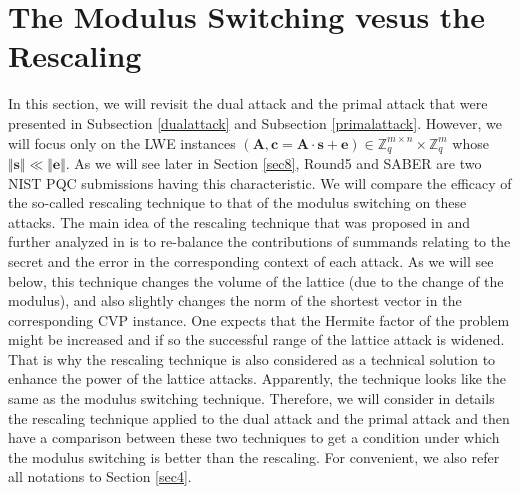 \documentclass{cta-author}
\begin{document}
\section{The Modulus Switching vesus the Rescaling } \label{modvsre}
In this section, we will revisit the dual attack and the primal attack that were presented in Subsection \ref{dualattack} and Subsection \ref{primalattack}. However, we will focus only on the LWE instances  $(\mathbf{A}, \mathbf{c}=\mathbf{A}\cdot \mathbf{s}+\mathbf{e}) \in \mathbb{Z}_q^{m \times n} \times \mathbb{Z}_q^m$ whose $\Vert \mathbf{s}\Vert \ll \Vert \mathbf{e} \Vert$. As we will see later in Section \ref{sec8}, Round5 \cite{BBGM+19} and SABER \cite{DKRV19} are two NIST PQC submissions having this characteristic. 
We will compare the efficacy of the so-called rescaling technique to that of the modulus switching on these attacks. The main idea of the rescaling technique that was proposed in \cite[Subsection 6.1]{BG14} and further analyzed in \cite{CKLS16, BBGM+19} is to re-balance the contributions of summands relating to the secret and the error in the corresponding context of each attack. As we will see below, this technique changes the volume of the lattice (due to the change of the modulus), and also slightly changes the norm of the shortest vector in the corresponding CVP instance. One expects that the Hermite factor of the problem might be increased and if so the successful range of the lattice attack is widened. That is why the rescaling technique is also considered as a technical solution to enhance the power of the lattice attacks.  Apparently, the technique looks like the same as the modulus switching technique. Therefore, we will consider in details the rescaling technique applied to the dual attack and the primal attack and then have a comparison between these two techniques to get a condition under which the modulus switching is better than the rescaling. For convenient, we also refer all notations to  Section \ref{sec4}.
 
\end{document}
